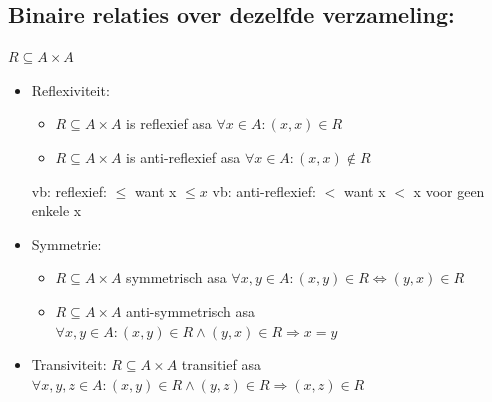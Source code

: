 \documentclass{article}
\begin{document}
\subsection{Binaire relaties over dezelfde verzameling:} \quad $R \subseteq A \times A$ 
\begin{itemize}
    \item Reflexiviteit: 
    \begin{itemize}
        \item $R \subseteq A \times A$ is reflexief asa $\forall x \in A:(x,x) \in R$
        \item $R \subseteq A \times A$ is anti-reflexief asa $\forall x \in A:(x,x) \notin R$
    \end{itemize}
    vb: reflexief: $\leq$ want x $\leq x$ \newline
    vb: anti-reflexief: $<$ want x $<$ x voor geen enkele x
    \item Symmetrie:
    \begin{itemize}
        \item $R \subseteq A \times A$ symmetrisch asa $\forall x,y \in A:(x,y) \in R \iff (y,x) \in R$
        \item $R \subseteq A \times A$ anti-symmetrisch asa $\forall x,y \in A:(x,y) \in R \land (y,x) \in R \Rightarrow x = y$
    \end{itemize}
    \item Transiviteit: $R \subseteq A \times A$ transitief asa $\forall x,y,z \in A:(x,y) \in R \land (y,z) \in R \Rightarrow (x,z) \in R$
\end{itemize}
\end{document}
